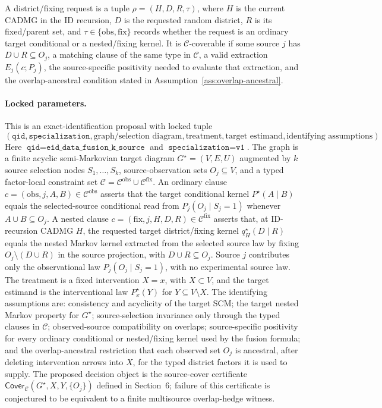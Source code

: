 \documentclass[11pt]{article}
\theoremstyle{definition}
\theoremstyle{plain}
\theoremstyle{remark}
\begin{document}
A district/fixing request is a tuple
\(\rho=(H,D,R,\tau)\), where \(H\) is the current CADMG in the ID recursion,
\(D\) is the requested random district, \(R\) is its fixed/parent set, and
\(\tau\in\{\mathrm{obs},\mathrm{fix}\}\) records whether the request is an
ordinary target conditional or a nested/fixing kernel.  It is
\(\mathcal C\)-coverable if some source \(j\) has \(D\cup R\subseteq O_j\), a
matching clause of the same type in \(\mathcal C\), a valid extraction
\(E_j(c;P_j)\), the source-specific positivity needed to evaluate that
extraction, and the overlap-ancestral condition stated in
Assumption~\ref{ass:overlap-ancestral}.

\paragraph{Locked parameters.}
This is an exact-identification proposal with locked tuple
\[
(\texttt{qid},\texttt{specialization},\text{graph/selection diagram},
\text{treatment},\text{target estimand},\text{identifying assumptions}).
\]
Here \(\texttt{qid}=\texttt{eid\_data\_fusion\_k\_source}\) and
\(\texttt{specialization}=\texttt{v1}\).  The graph is a finite acyclic
semi-Markovian target diagram \(G^\star=(V,E,U)\) augmented by \(k\) source
selection nodes \(S_1,\ldots,S_k\), source-observation sets
\(O_j\subseteq V\), and a typed factor-local constraint set
\(\mathcal C=\mathcal C^{\mathrm{obs}}\cup\mathcal C^{\mathrm{fix}}\).
An ordinary clause \(c=(\mathrm{obs},j,A,B)\in\mathcal C^{\mathrm{obs}}\)
asserts that the target conditional kernel \(P^\star(A\mid B)\) equals the
selected-source conditional read from \(P_j(O_j\mid S_j=1)\) whenever
\(A\cup B\subseteq O_j\).  A nested clause
\(c=(\mathrm{fix},j,H,D,R)\in\mathcal C^{\mathrm{fix}}\) asserts that, at
ID-recursion CADMG \(H\), the requested target district/fixing kernel
\(q^\star_H(D\mid R)\) equals the nested Markov kernel extracted from the
selected source law by fixing \(O_j\setminus(D\cup R)\) in the source
projection, with \(D\cup R\subseteq O_j\).  Source \(j\) contributes only the observational law
\(P_j(O_j\mid S_j=1)\), with no experimental source law.  The treatment is a
fixed intervention \(X=x\), with \(X\subset V\), and the target estimand is
the interventional law \(P^\star_x(Y)\) for \(Y\subseteq V\setminus X\).
The identifying assumptions are: consistency and acyclicity of the target
SCM; the target nested Markov property for \(G^\star\); source-selection
invariance only through the typed clauses in \(\mathcal C\);
observed-source compatibility on overlaps; source-specific positivity for
every ordinary conditional or nested/fixing kernel used by the fusion
formula; and the overlap-ancestral restriction that each observed set
\(O_j\) is ancestral, after deleting intervention arrows into \(X\), for the
typed district factors it is used to supply.  The proposed decision object is the
source-cover certificate \(\mathsf{Cover}_{\mathcal C}(G^\star,X,Y,\{O_j\})\)
defined in Section~6; failure of this certificate is conjectured to be
equivalent to a finite multisource overlap-hedge witness.
\end{document}
